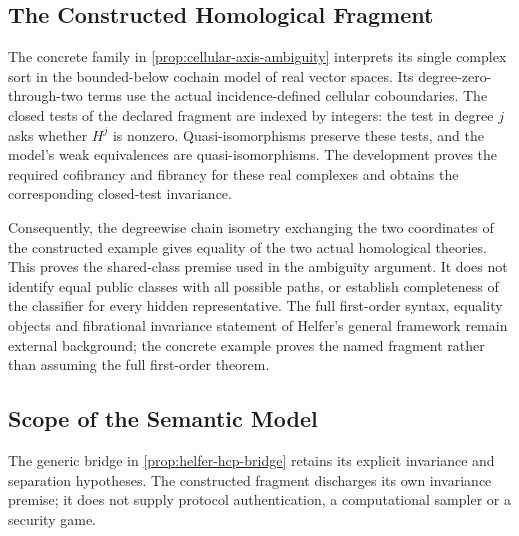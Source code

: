 \subsection{The Constructed Homological Fragment}

The concrete family in \cref{prop:cellular-axis-ambiguity} interprets its
single complex sort in the bounded-below cochain model of real vector spaces.
Its degree-zero-through-two terms use the actual incidence-defined cellular
coboundaries. The closed tests of the declared fragment are indexed by
integers: the test in degree \(j\) asks whether \(H^j\) is nonzero.
Quasi-isomorphisms preserve these tests, and the model's weak equivalences
are quasi-isomorphisms. The development proves the required cofibrancy and
fibrancy for these real complexes and obtains the corresponding
closed-test invariance.

Consequently, the degreewise chain isometry exchanging the two coordinates
of the constructed example gives equality of the two actual homological
theories. This proves the shared-class premise used in the ambiguity
argument. It does not identify equal public classes with all possible paths,
or establish completeness of the classifier for every hidden representative.
The full first-order syntax, equality objects and fibrational invariance
statement of Helfer's general framework remain external background; the
concrete example proves the named fragment rather than assuming the full
first-order theorem.

\subsection{Scope of the Semantic Model}

The generic bridge in
\cref{prop:helfer-hcp-bridge} retains its explicit invariance and separation
hypotheses. The constructed fragment discharges its own invariance premise;
it does not supply protocol authentication, a computational sampler or a
security game.
